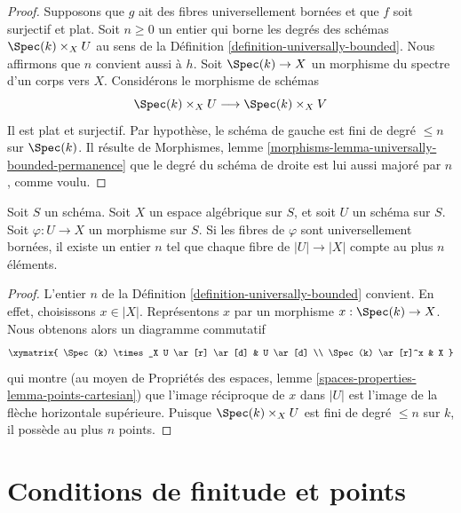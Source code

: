 \begin{proof}
Supposons que $g$ ait des fibres universellement bornées et que $f$ soit
surjectif et plat. Soit $n \geq 0$ un entier qui borne les degrés des schémas
$\Spec(k) \times_X U$ au sens de la
Définition \ref{definition-universally-bounded}.
Nous affirmons que $n$ convient aussi à $h$.
Soit $\Spec(k) \to X$ un morphisme du spectre d'un corps vers $X$.
Considérons le morphisme de schémas
$$
\Spec(k) \times_X U \longrightarrow \Spec(k) \times_X V
$$
Il est plat et surjectif. Par hypothèse, le schéma de gauche est fini de degré
$\leq n$ sur $\Spec(k)$. Il résulte de
Morphismes, lemme \ref{morphisms-lemma-universally-bounded-permanence}
que le degré du schéma de droite est lui aussi majoré par $n$, comme voulu.
\end{proof}

\begin{lemma}
\label{lemma-universally-bounded-finite-fibres}
Soit $S$ un schéma.
Soit $X$ un espace algébrique sur $S$, et soit $U$ un schéma sur $S$.
Soit $\varphi : U \to X$ un morphisme sur $S$.
Si les fibres de $\varphi$ sont universellement bornées, il existe un entier
$n$ tel que chaque fibre de $|U| \to |X|$ compte au plus $n$ éléments.
\end{lemma}

\begin{proof}
L'entier $n$ de la Définition \ref{definition-universally-bounded} convient.
En effet, choisissons $x \in |X|$. Représentons $x$ par un morphisme
$x : \Spec(k) \to X$. Nous obtenons alors un diagramme commutatif
$$
\xymatrix{
\Spec(k) \times_X U \ar[r] \ar[d] & U \ar[d] \\
\Spec(k) \ar[r]^x & X
}
$$
qui montre (au moyen de
Propriétés des espaces,
lemme \ref{spaces-properties-lemma-points-cartesian})
que l'image réciproque de $x$ dans $|U|$ est l'image de la flèche horizontale
supérieure. Puisque $\Spec(k) \times_X U$ est fini de degré $\leq n$ sur $k$,
il possède au plus $n$ points.
\end{proof}











\section{Conditions de finitude et points}
\label{section-points-monomorphisms}

